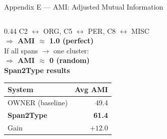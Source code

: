 \documentclass[aspectratio=169,10pt]{beamer}
\newcommand{\hg}[1]{\textcolor{dkgreen}{\textbf{#1}}}
\begin{document}
\begin{frame}{Appendix E — AMI: Adjusted Mutual Information}
\begin{columns}[T]
\begin{column}{0.44\textwidth}
      C2 $\leftrightarrow$ ORG, C5 $\leftrightarrow$ PER, C8 $\leftrightarrow$ MISC\\
      \hg{$\Rightarrow$ AMI $\approx$ 1.0 (perfect)}\\[10pt]

      If all spans $\to$ one cluster:\\
      \hg{$\Rightarrow$ AMI $\approx$ 0 (random)}\\[10pt]

      \textbf{Span2Type results}\\[3pt]
      \begin{tabular}{lr}
        \toprule
        System & Avg AMI \\
        \midrule
        OWNER (baseline) & 49.4 \\
        \rowcolor{gold!25}
        \textbf{Span2Type} & \textbf{61.4} \\
        Gain & \hg{$+12.0$} \\
        \bottomrule
      \end{tabular}
    \end{column}
  \end{columns}
\end{frame}
\end{document}
